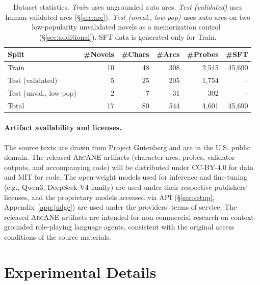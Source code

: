 \documentclass{llmxive}
\providecommand{\ours}{\textsc{ArcANE}}
\providecommand{\arraystretch}{0.95}
\begin{document}
\begin{table}[t]
\centering
\scriptsize
\setlength{\tabcolsep}{4pt}
\renewcommand{\arraystretch}{0.9}
\setlength{\aboverulesep}{0.2ex}
\setlength{\belowrulesep}{0.2ex}
\begin{tabular}{lrrrrr}
\toprule
Split & \#Novels & \#Chars & \#Arcs & \#Probes & \#SFT \\
\midrule
Train                       & 10 & 48 &  308 & 2{,}545 & 45{,}690 \\
Test (validated)            &  5 & 25 &  205 & 1{,}754 & --       \\
Test (unval., low-pop)      &  2 &  7 &   31 &   302   & --       \\
\midrule
Total                       & 17 & 80 &  544 & 4{,}601 & 45{,}690 \\
\bottomrule
\end{tabular}
\caption{Dataset statistics. \emph{Train} uses ungrounded auto arcs. \emph{Test (validated)} uses human-validated arcs (\S\ref{sec:arc}). \emph{Test (unval., low-pop)} uses auto arcs on two low-popularity unvalidated novels as a memorization control~\cite{han-etal-2026-quantifying} (\S\ref{sec:additional}). SFT data is generated only for Train.}
\label{tab:data_stats}
\end{table}

\paragraph{Artifact availability and licenses.}
The source texts are drawn from Project Gutenberg and are in the U.S. public domain. The released \ours{} artifacts (character arcs, probes, validator outputs, and accompanying code) will be distributed under CC-BY-4.0 for data and MIT for code. The open-weight models used for inference and fine-tuning (e.g., Qwen3, DeepSeek-V4 family) are used under their respective publishers' licenses, and the proprietary models accessed via API (\S\ref{sec:setup}, Appendix~\ref{app:judge}) are used under the providers' terms of service. The released \ours{} artifacts are intended for non-commercial research on context-grounded role-playing language agents, consistent with the original access conditions of the source materials.

\section{Experimental Details}
\label{app:training_details}
\end{document}
